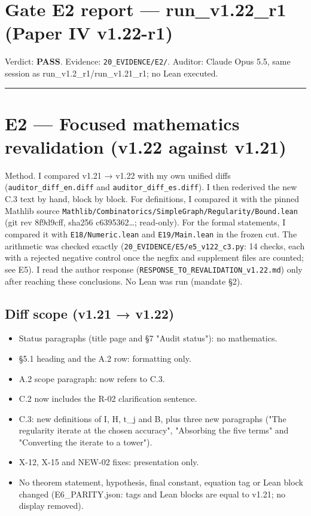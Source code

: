 \documentclass[
]{article}
\author{}
\date{}
\providecommand{\tightlist}{%
  \setlength{\itemsep}{0pt}\setlength{\parskip}{0pt}}
\begin{document}
\section{Gate E2 report --- run\_v1.22\_r1 (Paper IV
v1.22-r1)}\label{gate-e2-report--run_v122_r1-paper-iv-v122-r1}

Verdict: \textbf{PASS}. Evidence: \texttt{20\_EVIDENCE/E2/}. Auditor:
Claude Opus 5.5, same session as run\_v1.2\_r1/run\_v1.21\_r1; no Lean
executed.

\begin{center}\rule{0.5\linewidth}{0.5pt}\end{center}

\section{E2 --- Focused mathematics revalidation (v1.22 against
v1.21)}\label{e2--focused-mathematics-revalidation-v122-against-v121}

Method. I compared v1.21 → v1.22 with my own unified diffs
(\texttt{auditor\_diff\_en.diff} and \texttt{auditor\_diff\_es.diff}). I
then rederived the new C.3 text by hand, block by block. For
definitions, I compared it with the pinned Mathlib source
\texttt{Mathlib/Combinatorics/SimpleGraph/Regularity/Bound.lean} (git
rev 8f9d9cff, sha256 c6395362\ldots; read-only). For the formal
statements, I compared it with \texttt{E18/Numeric.lean} and
\texttt{E19/Main.lean} in the frozen cut. The arithmetic was checked
exactly (\texttt{20\_EVIDENCE/E5/e5\_v122\_c3.py}: 14 checks, each with
a rejected negative control once the negfix and supplement files are
counted; see E5). I read the author response
(\texttt{RESPONSE\_TO\_REVALIDATION\_v1.22.md}) only after reaching
these conclusions. No Lean was run (mandate §2).

\subsection{Diff scope (v1.21 → v1.22)}\label{diff-scope-v121--v122}

\begin{itemize}
\tightlist
\item
  Status paragraphs (title page and §7 "Audit status"): no mathematics.
\item
  §5.1 heading and the A.2 row: formatting only.
\item
  A.2 scope paragraph: now refers to C.3.
\item
  C.2 now includes the R-02 clarification sentence.
\item
  C.3: new definitions of I, H, t\_j and B, plus three new paragraphs
  ("The regularity iterate at the chosen accuracy", "Absorbing the five
  terms" and "Converting the iterate to a tower").
\item
  X-12, X-15 and NEW-02 fixes: presentation only.
\item
  No theorem statement, hypothesis, final constant, equation tag or Lean
  block changed (E6\_PARITY.json: tags and Lean blocks are equal to
  v1.21; no display removed).
\end{itemize}
\end{document}
